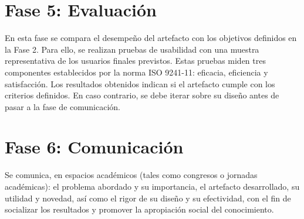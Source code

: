 \section{Fase 5: Evaluación} En esta fase se compara el desempeño del  artefacto
con los objetivos definidos en la Fase 2. Para  ello,  se  realizan  pruebas  de
usabilidad con una muestra representativa de  los  usuarios  finales  previstos.
Estas pruebas miden tres componentes establecidos  por  la  norma  ISO  9241-11:
eficacia, eficiencia y satisfacción. Los  resultados  obtenidos  indican  si  el
artefacto cumple con los criterios definidos. En caso contrario, se debe  iterar
sobre su diseño antes de pasar a la fase de comunicación.



\section{Fase 6: Comunicación} Se comunica, en espacios  académicos  (tales  como
congresos o jornadas académicas): el problema  abordado  y  su  importancia,  el
artefacto desarrollado, su utilidad y novedad, así como el rigor de su diseño  y
su  efectividad,  con  el  fin  de  socializar  los  resultados  y  promover  la
apropiación social del conocimiento.